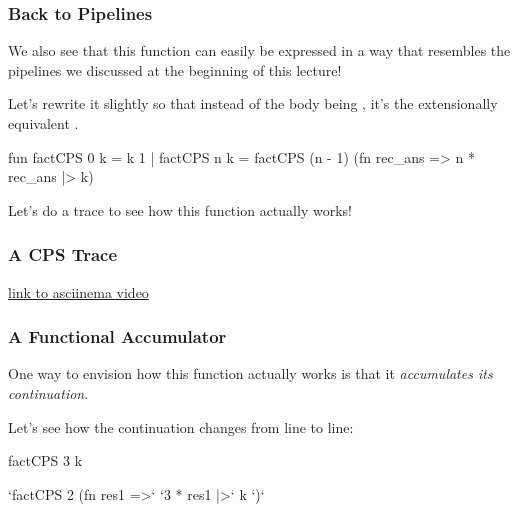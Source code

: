 \documentclass[aspectratio=169]{beamer}
\begin{document}
\begin{frame}[fragile]
  \frametitle{Back to Pipelines}

  We also see that this function can easily be expressed in a way that
  resembles the pipelines we discussed at the beginning of this lecture!

  \pause
  \vspace{\fill}

  Let's rewrite it slightly so that instead of the body being ,
  it's the extensionally equivalent .

  \pause
  \begin{codeblock}
    fun factCPS 0 k = k 1
      | factCPS n k =
          factCPS (n - 1)    (fn rec_ans =>
          n * rec_ans     |> k)
  \end{codeblock}

  \pause
  \vspace{\fill}

  Let's do a trace to see how this function actually works!
\end{frame}

\begin{frame}[fragile]
  \frametitle{A CPS Trace}

  \begin{center}
    \huge \color{blue} \href{https://asciinema.org/a/WxUSfzU1xOdbJkikgyy6wFJ0l}{link to asciinema video}
\end{center}
\end{frame}

\begin{frame}[fragile]
  \frametitle{A Functional Accumulator}

  One way to envision how this function actually works is that it \textit{accumulates
  its continuation}.

  \pause
  \vspace{\fill}

  Let's see how the continuation changes from line to line:

  \begin{codeblock}
    factCPS 3 k
  \end{codeblock}

  \pause
  \vspace{\fill}

  \begin{codeblock}
    `factCPS 2    (fn res1 =>`
    `3 * res1  |>` k `)`
  \end{codeblock}
\end{frame}
\end{document}
